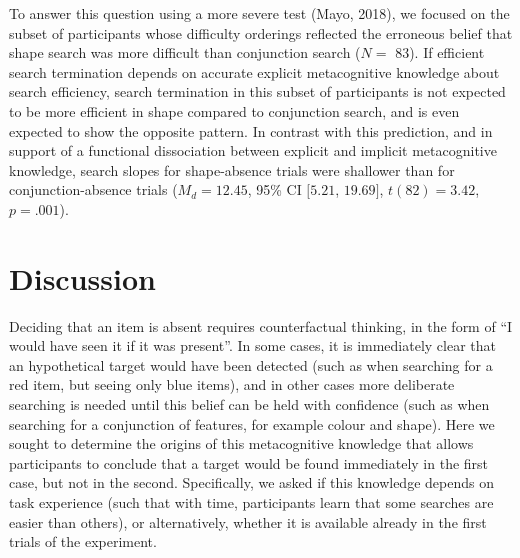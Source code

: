 \documentclass[
  english,
  man]{apa6}
\begin{document}
To answer this question using a more severe test (Mayo, 2018), we focused on the subset of participants whose difficulty orderings reflected the erroneous belief that shape search was more difficult than conjunction search (\(N=\) 83). If efficient search termination depends on accurate explicit metacognitive knowledge about search efficiency, search termination in this subset of participants is not expected to be more efficient in shape compared to conjunction search, and is even expected to show the opposite pattern. In contrast with this prediction, and in support of a functional dissociation between explicit and implicit metacognitive knowledge, search slopes for shape-absence trials were shallower than for conjunction-absence trials (\(M_d = 12.45\), 95\% CI \([5.21\), \(19.69]\), \(t(82) = 3.42\), \(p = .001\)).

\hypertarget{discussion}{%
\section{Discussion}\label{discussion}}

Deciding that an item is absent requires counterfactual thinking, in the form of \enquote{I would have seen it if it was present}. In some cases, it is immediately clear that an hypothetical target would have been detected (such as when searching for a red item, but seeing only blue items), and in other cases more deliberate searching is needed until this belief can be held with confidence (such as when searching for a conjunction of features, for example colour and shape). Here we sought to determine the origins of this metacognitive knowledge that allows participants to conclude that a target would be found immediately in the first case, but not in the second. Specifically, we asked if this knowledge depends on task experience (such that with time, participants learn that some searches are easier than others), or alternatively, whether it is available already in the first trials of the experiment.
\end{document}
